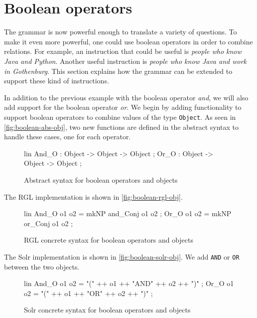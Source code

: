 \section{Boolean operators}
The grammar is now powerful enough to translate a variety of questions. To make it even more powerful, one could use boolean operators in order to combine relations. For example, an instruction that could be useful is \emph{people who know Java and Python}. Another useful instruction is \emph{people who know Java and work in Gothenburg}. This section explains how the grammar can be extended to support these kind of instructions.

In addition to the previous example with the boolean operator \emph{and}, we will also add support for the boolean operator \emph{or}. We begin by adding functionality to support boolean operators to combine values of the type \texttt{Object}. As seen in \autoref{fig:boolean-abs-obj}, two new functions are defined in the abstract syntax to handle these cases, one for each operator.

\begin{figure}[H]
\begin{code}
lin
  And_O : Object -> Object -> Object ;
  Or_O : Object -> Object -> Object ;
\end{code}
\caption{Abstract syntax for boolean operators and objects\label{fig:boolean-abs-obj}}
\end{figure}

The RGL implementation is shown in \autoref{fig:boolean-rgl-obj}.

\begin{figure}[H]
\begin{code}
lin
  And_O o1 o2 = mkNP and_Conj o1 o2 ;
  Or_O o1 o2 = mkNP or_Conj o1 o2 ;
\end{code}
\caption{RGL concrete syntax for boolean operators and objects\label{fig:boolean-rgl-obj}}
\end{figure}

The Solr implementation is shown in \autoref{fig:boolean-solr-obj}. We add \texttt{AND} or \texttt{OR} between the two objects.

\begin{figure}[H]
\begin{code}
lin
  And_O o1 o2 = "(" ++ o1 ++ "AND" ++ o2 ++ ")" ;
  Or_O o1 o2 = "(" ++ o1 ++ "OR" ++ o2 ++ ")" ;
\end{code}
\caption{Solr concrete syntax for boolean operators and objects\label{fig:boolean-solr-obj}}
\end{figure}

